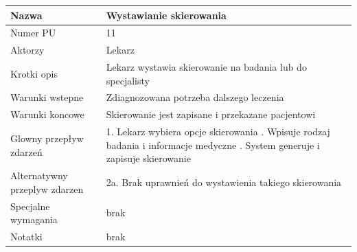 \documentclass{article}
\begin{document}
\vspace{1cm}

\noindent
\begin{tabular}{|m{10em}|m{30em}|}
        \hline
        Nazwa & Wystawianie skierowania \\
        \hline
        Numer PU & 11\\
        \hline
        Aktorzy & Lekarz\\
        \hline
        Krotki opis & Lekarz wystawia skierowanie na badania lub do specjalisty\\
        \hline
        Warunki wstepne & Zdiagnozowana potrzeba dalszego leczenia\\
        \hline
        Warunki koncowe & Skierowanie jest zapisane i przekazane pacjentowi\\
        \hline
        Glowny przepływ zdarzeń & 1. Lekarz wybiera opcje skierowania \newline
                                 2. Wpisuje rodzaj badania i informacje medyczne \newline
                                 3. System generuje i zapisuje skierowanie  \\
        \hline
        Alternatywny przeplyw zdarzen &  2a. Brak uprawnień do wystawienia takiego skierowania\\
        \hline
        Specjalne wymagania & brak\\
        \hline
        Notatki& brak\\
        \hline
\end{tabular}
\end{document}

